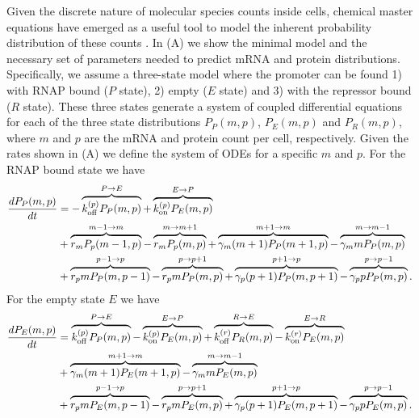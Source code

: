 Given the discrete nature of molecular species counts inside cells, chemical
master equations have emerged as a useful tool to model the inherent probability
distribution of these counts \cite{Sanchez2013}. In (A)
we show the minimal model and the necessary set of parameters needed to predict
mRNA and protein distributions. Specifically, we assume a three-state model
where the promoter can be found 1) with RNAP bound ($P$ state), 2) empty ($E$
state) and 3) with the repressor bound ($R$ state). These three states generate
a system of coupled differential equations for each of the three state
distributions $P_P(m, p)$, $P_E(m, p)$ and $P_R(m, p)$, where $m$ and $p$ are
the mRNA and protein count per cell, respectively. Given the rates shown in
(A) we define the system of ODEs for a specific $m$
and $p$. For the RNAP bound state we have
\begin{equation}
  \begin{aligned}
    \dt{P_P(m, p)} &=
    - \overbrace{\kpoff P_P(m, p)}^{P \rightarrow E} %
    + \overbrace{\kpon P_E(m, p)}^{E \rightarrow P}\\ %
    &+ \overbrace{r_m P_p(m-1, p)}^{m-1 \rightarrow m} %
    - \overbrace{r_m P_p(m, p)}^{m \rightarrow m+1}%
    + \overbrace{\gm (m + 1) P_P(m+1 , p)}^{m+1 \rightarrow m} %
    - \overbrace{\gm m P_P(m , p)}^{m \rightarrow m-1}\\ %
    &+ \overbrace{r_p m P_P(m, p - 1)}^{p-1 \rightarrow p} %
    - \overbrace{r_p m P_P(m, p)}^{p \rightarrow p+1} %
    + \overbrace{\gp (p + 1) P_P(m, p + 1)}^{p + 1 \rightarrow p} %
    - \overbrace{\gp p P_P(m, p)}^{p \rightarrow p-1}. %
  \end{aligned}
\end{equation}
For the empty state $E$ we have
\begin{equation}
  \begin{aligned}
    \dt{P_E(m, p)} &=
    \overbrace{\kpoff P_P(m, p)}^{P \rightarrow E} %
    - \overbrace{\kpon P_E(m, p)}^{E \rightarrow P} %
    + \overbrace{\kroff P_R(m, p)}^{R \rightarrow E} %
    - \overbrace{\kron P_E(m, p)}^{E \rightarrow R}\\ %
    &+ \overbrace{\gm (m + 1) P_E(m+1 , p)}^{m+1 \rightarrow m} %
    - \overbrace{\gm m P_E(m , p)}^{m \rightarrow m-1}\\ %
    &+ \overbrace{r_p m P_E(m, p - 1)}^{p-1 \rightarrow p} %
    - \overbrace{r_p m P_E(m, p)}^{p \rightarrow p+1} %
    + \overbrace{\gp (p + 1) P_E(m, p + 1)}^{p + 1 \rightarrow p} %
    - \overbrace{\gp p P_E(m, p)}^{p \rightarrow p-1}. %
  \end{aligned}
\end{equation}
